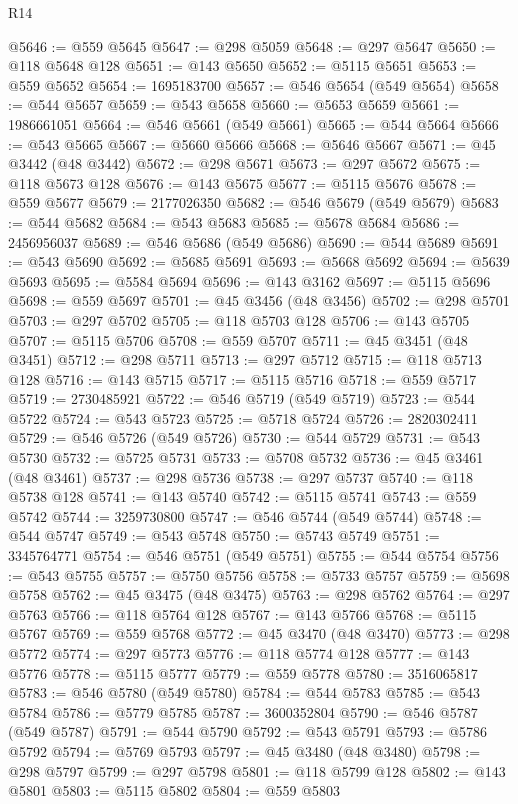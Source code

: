 \begin{lexlean}{R14}
\begin{coremodule}
{{{{{{{{{{{{{{{{{{{{{{{{{{{{{{{{{{{{{{{{{{{{{{{{{{{{{{{{{{{{{{{{{{{{{{{{{{{{{{{{{{@5646 := @559 @5645
@5647 := @298 @5059
@5648 := @297 @5647
@5650 := @118 @5648 @128
@5651 := @143 @5650
@5652 := @5115 @5651
@5653 := @559 @5652
@5654 := 1695183700
@5657 := @546 @5654 (@549 @5654)
@5658 := @544 @5657
@5659 := @543 @5658
@5660 := @5653 @5659
@5661 := 1986661051
@5664 := @546 @5661 (@549 @5661)
@5665 := @544 @5664
@5666 := @543 @5665
@5667 := @5660 @5666
@5668 := @5646 @5667
@5671 := @45 @3442 (@48 @3442)
@5672 := @298 @5671
@5673 := @297 @5672
@5675 := @118 @5673 @128
@5676 := @143 @5675
@5677 := @5115 @5676
@5678 := @559 @5677
@5679 := 2177026350
@5682 := @546 @5679 (@549 @5679)
@5683 := @544 @5682
@5684 := @543 @5683
@5685 := @5678 @5684
@5686 := 2456956037
@5689 := @546 @5686 (@549 @5686)
@5690 := @544 @5689
@5691 := @543 @5690
@5692 := @5685 @5691
@5693 := @5668 @5692
@5694 := @5639 @5693
@5695 := @5584 @5694
@5696 := @143 @3162
@5697 := @5115 @5696
@5698 := @559 @5697
@5701 := @45 @3456 (@48 @3456)
@5702 := @298 @5701
@5703 := @297 @5702
@5705 := @118 @5703 @128
@5706 := @143 @5705
@5707 := @5115 @5706
@5708 := @559 @5707
@5711 := @45 @3451 (@48 @3451)
@5712 := @298 @5711
@5713 := @297 @5712
@5715 := @118 @5713 @128
@5716 := @143 @5715
@5717 := @5115 @5716
@5718 := @559 @5717
@5719 := 2730485921
@5722 := @546 @5719 (@549 @5719)
@5723 := @544 @5722
@5724 := @543 @5723
@5725 := @5718 @5724
@5726 := 2820302411
@5729 := @546 @5726 (@549 @5726)
@5730 := @544 @5729
@5731 := @543 @5730
@5732 := @5725 @5731
@5733 := @5708 @5732
@5736 := @45 @3461 (@48 @3461)
@5737 := @298 @5736
@5738 := @297 @5737
@5740 := @118 @5738 @128
@5741 := @143 @5740
@5742 := @5115 @5741
@5743 := @559 @5742
@5744 := 3259730800
@5747 := @546 @5744 (@549 @5744)
@5748 := @544 @5747
@5749 := @543 @5748
@5750 := @5743 @5749
@5751 := 3345764771
@5754 := @546 @5751 (@549 @5751)
@5755 := @544 @5754
@5756 := @543 @5755
@5757 := @5750 @5756
@5758 := @5733 @5757
@5759 := @5698 @5758
@5762 := @45 @3475 (@48 @3475)
@5763 := @298 @5762
@5764 := @297 @5763
@5766 := @118 @5764 @128
@5767 := @143 @5766
@5768 := @5115 @5767
@5769 := @559 @5768
@5772 := @45 @3470 (@48 @3470)
@5773 := @298 @5772
@5774 := @297 @5773
@5776 := @118 @5774 @128
@5777 := @143 @5776
@5778 := @5115 @5777
@5779 := @559 @5778
@5780 := 3516065817
@5783 := @546 @5780 (@549 @5780)
@5784 := @544 @5783
@5785 := @543 @5784
@5786 := @5779 @5785
@5787 := 3600352804
@5790 := @546 @5787 (@549 @5787)
@5791 := @544 @5790
@5792 := @543 @5791
@5793 := @5786 @5792
@5794 := @5769 @5793
@5797 := @45 @3480 (@48 @3480)
@5798 := @298 @5797
@5799 := @297 @5798
@5801 := @118 @5799 @128
@5802 := @143 @5801
@5803 := @5115 @5802
@5804 := @559 @5803
}}}}}}}}}}}}}}}}}}}}}}}}}}}}}}}}}}}}}}}}}}}}}}}}}}}}}}}}}}}}}}}}}}}}}}}}}}}}}}}}}}
\end{coremodule}
\end{lexlean}
